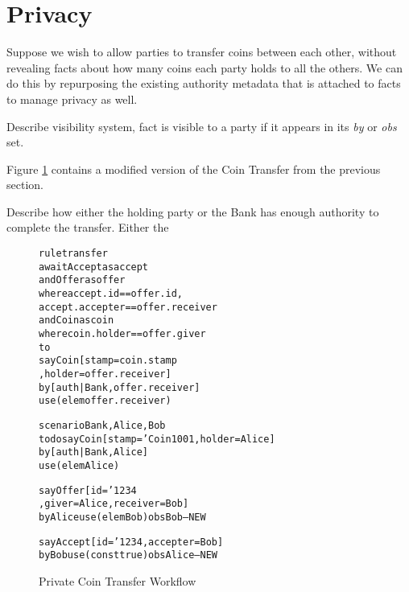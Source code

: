 
\clearpage{}
\section{Privacy}
\label{s:Privacy}

Suppose we wish to allow parties to transfer coins between each other, without revealing facts about how many coins each party holds to all the others. We can do this by repurposing the existing authority metadata that is attached to facts to manage privacy as well.

Describe visibility system, fact is visible to a party if it appears in its \emph{by} or \emph{obs} set.

Figure \ref{f:PrivateCoinTransfer} contains a modified version of the Coin Transfer from the previous section.

Describe how either the holding party or the Bank has enough authority to complete the transfer. Either the


\begin{figure}
\begin{small}
\begin{alltt}
rule  transfer
await Accept  as accept
 and  Offer   as offer
      where   accept.id       == offer.id,
              accept.accepter == offer.receiver
 and  Coin    as coin
      where   coin.holder     == offer.giver
to
      say Coin   [ stamp  = coin.stamp
                 , holder = offer.receiver]
      by  [auth| Bank, offer.receiver]
      use (elem offer.receiver)

scenario Bank, Alice, Bob
to do say Coin   [ stamp = 'Coin1001, holder = Alice]
      by  [auth| Bank, Alice]
      use (elem Alice)

      say Offer  [ id    = '1234
                 , giver = Alice, receiver = Bob]
      by  Alice use (elem Bob)   obs Bob          -- NEW

      say Accept [ id = '1234,    accepter = Bob]
      by  Bob   use (const true) obs Alice        -- NEW
\end{alltt}
\end{small}

\caption{Private Coin Transfer Workflow}
\label{f:PrivateCoinTransfer}
\end{figure}
